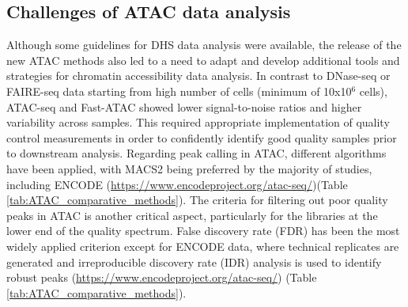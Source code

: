 \subsection{Challenges of ATAC data analysis}  
Although some guidelines for DHS data analysis were available, the release of the new ATAC methods also led to a need to adapt and develop additional tools and strategies for chromatin accessibility data analysis. In contrast to DNase-seq or FAIRE-seq data starting from high number of cells (minimum of 10x10$^6$ cells), ATAC-seq and Fast-ATAC showed lower signal-to-noise ratios and higher variability across samples. This required appropriate implementation of quality control measurements in order to confidently identify good quality samples prior to downstream analysis. Regarding peak calling in ATAC, different algorithms have been applied, with MACS2 being preferred by the majority of studies, including ENCODE (\url{https://www.encodeproject.org/atac-seq/})(Table \ref{tab:ATAC_comparative_methods}). The criteria for filtering out poor quality peaks in ATAC is another critical aspect, particularly for the libraries at the lower end of the quality spectrum. False discovery rate (FDR) has been the most widely applied criterion except for ENCODE data, where technical replicates are generated and irreproducible discovery rate (IDR) analysis is used to identify robust peaks (\url{https://www.encodeproject.org/atac-seq/}) (Table \ref{tab:ATAC_comparative_methods}). 


